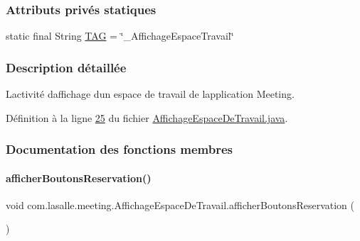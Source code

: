 \subsubsection*{Attributs privés statiques}
\begin{DoxyCompactItemize}
\item 
static final String \hyperlink{classcom_1_1lasalle_1_1meeting_1_1_affichage_espace_de_travail_a8606eb11c7b28f52226544de431d86a4}{T\+AG} = \char`\"{}\+\_\+\+Affichage\+Espace\+Travail\char`\"{}
\end{DoxyCompactItemize}


\subsubsection{Description détaillée}
L\textquotesingle{}activité d\textquotesingle{}affichage d\textquotesingle{}un espace de travail de l\textquotesingle{}application Meeting. 

Définition à la ligne \hyperlink{_affichage_espace_de_travail_8java_source_l00025}{25} du fichier \hyperlink{_affichage_espace_de_travail_8java_source}{Affichage\+Espace\+De\+Travail.\+java}.



\subsubsection{Documentation des fonctions membres}
\mbox{\label{classcom_1_1lasalle_1_1meeting_1_1_affichage_espace_de_travail_a01e3d2585c84043dbe5086a2fc81c371}} 
\paragraph{\texorpdfstring{afficher\+Boutons\+Reservation()}{afficherBoutonsReservation()}}
{\footnotesize\ttfamily void com.\+lasalle.\+meeting.\+Affichage\+Espace\+De\+Travail.\+afficher\+Boutons\+Reservation (\begin{DoxyParamCaption}{ }\end{DoxyParamCaption})}



